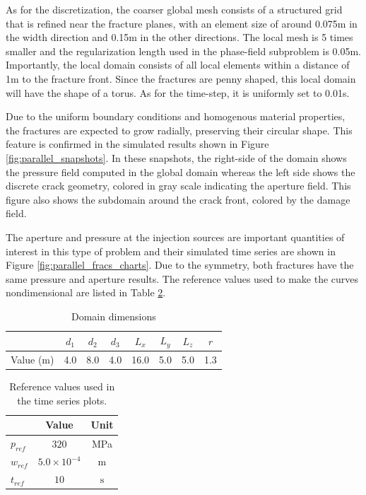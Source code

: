 As for the discretization, the coarser global mesh consists of a structured grid that is refined near the fracture planes, with an element size of around 0.075m in the width direction and 0.15m in the other directions. The local mesh is 5 times smaller and the regularization length used in the phase-field subproblem is 0.05m. Importantly, the local domain consists of all local elements within a distance of 1m to the fracture front. Since the fractures are penny shaped, this local domain will have the shape of a torus. As for the time-step, it is uniformly set to 0.01s.

Due to the uniform boundary conditions and homogenous material properties, the fractures are expected to grow radially, preserving their circular shape. This feature is confirmed in the simulated results shown in Figure \ref{fig:parallel_snapshots}. In these snapshots, the right-side of the domain shows the pressure field computed in the global domain whereas the left side shows the discrete crack geometry, colored in gray scale indicating the aperture field. This figure also shows the subdomain around the crack front, colored by the damage field.

The aperture and pressure at the injection sources are important quantities of interest in this type of problem and their simulated time series are shown in Figure \ref{fig:parallel_fracs_charts}. Due to the symmetry, both fractures have the same pressure and aperture results. The reference values used to make the curves nondimensional are listed in Table \ref{parallel_refs}.

\begin{table}[ht]
  \centering
  \caption{Domain dimensions}
  \begin{tabular}[t]{lccccccc}
  \hline
  &$d_1$&$d_2$&$d_3$&$L_x$&$L_y$&$L_z$&$r$\\  
  \hline
  Value (m) & 4.0 & 8.0 & 4.0 & 16.0 & 5.0 & 5.0 & 1.3\\
  \hline
  \end{tabular}
  \label{parallel_measures}
\end{table}%

\begin{table}[ht]
  \centering
  \caption{Reference values used in the time series plots.}
  \begin{tabular}[t]{lcc}
  \hline
  &Value &Unit \\
  \hline
  $p_{ref}$&$320$&MPa\\
  $w_{ref}$&$5.0\times10^{-4}$&m\\
  $t_{ref}$&$10$&$\text{s}$\\
  \hline
  \end{tabular}
  \label{parallel_refs}
\end{table}%

